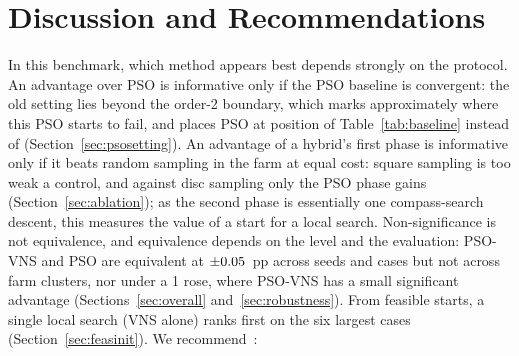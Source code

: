 \section{Discussion and Recommendations}
\label{sec:discussion}
In this benchmark, which method appears best depends strongly on the protocol. An advantage over PSO is informative only if the PSO baseline is convergent: the old setting lies beyond the order-2 boundary, which marks approximately where this PSO starts to fail, and places PSO at position \NBaseOldPSOPos{} of Table~\ref{tab:baseline} instead of \NBaseNewPSOPos{} (Section~\ref{sec:psosetting}). An advantage of a hybrid's first phase is informative only if it beats random sampling in the farm at equal cost: square sampling is too weak a control, and against disc sampling only the PSO phase gains (Section~\ref{sec:ablation}); as the second phase is essentially one compass-search descent, this measures the value of a start for a local search. Non-significance is not equivalence, and equivalence depends on the level and the evaluation: PSO-VNS and PSO are equivalent at $\pm0.05$~pp across seeds and cases but not across farm clusters, nor under a 1\textdegree{} rose, where PSO-VNS has a small significant advantage (Sections~\ref{sec:overall} and~\ref{sec:robustness}). From feasible starts, a single local search (VNS alone) ranks first on the six largest cases (Section~\ref{sec:feasinit}). We recommend~\cite{BartzBeielstein2020,LaTorre2021}:
